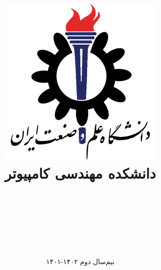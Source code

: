 \title{
    \includegraphics[width=0.35\linewidth]{images/IUST_logo_color.png} \\
    دانشکده مهندسی کامپیوتر \\[0.25in]
    \CourseName \\[0.25in]
  \\[0.25in]}
  
\date{نیم‌سال دوم ۱۴۰۲-۱۴۰۱}
\author{\TATwo \\ \\ \Instructor}